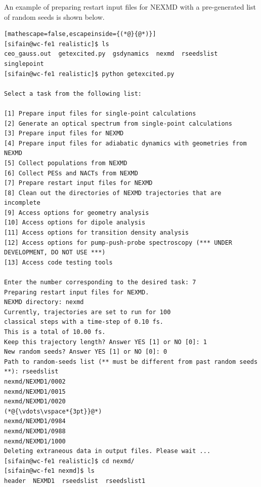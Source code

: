 \documentclass[letterpaper,12pt,titlepage]{article}
\begin{document}
An example of preparing restart input files for NEXMD with a pre-generated list of random seeds is shown below.
\begin{lstlisting}[mathescape=false,escapeinside={(*@}{@*)}]
[sifain@wc-fe1 realistic]$ ls
ceo_gauss.out  getexcited.py  gsdynamics  nexmd  rseedslist  singlepoint
[sifain@wc-fe1 realistic]$ python getexcited.py 

Select a task from the following list:

[1] Prepare input files for single-point calculations
[2] Generate an optical spectrum from single-point calculations
[3] Prepare input files for NEXMD
[4] Prepare input files for adiabatic dynamics with geometries from NEXMD
[5] Collect populations from NEXMD
[6] Collect PESs and NACTs from NEXMD
[7] Prepare restart input files for NEXMD
[8] Clean out the directories of NEXMD trajectories that are incomplete
[9] Access options for geometry analysis
[10] Access options for dipole analysis
[11] Access options for transition density analysis
[12] Access options for pump-push-probe spectroscopy (*** UNDER DEVELOPMENT, DO NOT USE ***)
[13] Access code testing tools

Enter the number corresponding to the desired task: 7
Preparing restart input files for NEXMD.
NEXMD directory: nexmd 
Currently, trajectories are set to run for 100 
classical steps with a time-step of 0.10 fs.
This is a total of 10.00 fs.
Keep this trajectory length? Answer YES [1] or NO [0]: 1
New random seeds? Answer YES [1] or NO [0]: 0
Path to random-seeds list (** must be different from past random seeds **): rseedslist 
nexmd/NEXMD1/0002
nexmd/NEXMD1/0015
nexmd/NEXMD1/0020
(*@{\vdots\vspace*{3pt}}@*)
nexmd/NEXMD1/0984
nexmd/NEXMD1/0988
nexmd/NEXMD1/1000
Deleting extraneous data in output files. Please wait ...
[sifain@wc-fe1 realistic]$ cd nexmd/
[sifain@wc-fe1 nexmd]$ ls
header  NEXMD1  rseedslist  rseedslist1
\end{lstlisting}
\end{document}
